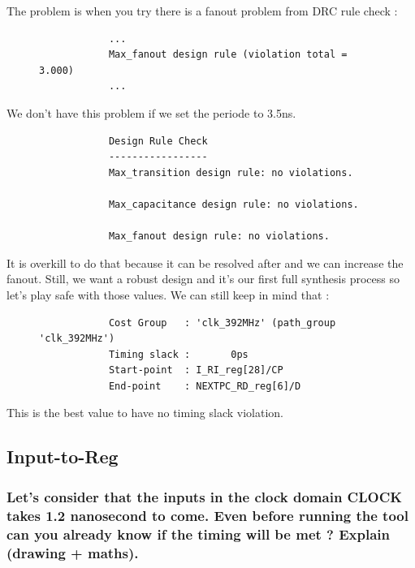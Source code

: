 \documentclass[11pt,a4paper,sans,dvipsnames]{report}
\begin{document}
	The problem is when you try  there is a fanout problem from DRC rule check :

	\begin{figure}[h!]
		\centering
		\begin{lstlisting}
			...
			Max_fanout design rule (violation total = 3.000)
			...
		\end{lstlisting}
	\end{figure}

	We don't have this problem if we set the periode to 3.5ns.


	\begin{figure}[h!]
		\centering
		\begin{lstlisting}
			Design Rule Check
			-----------------
			Max_transition design rule: no violations.

			Max_capacitance design rule: no violations.

			Max_fanout design rule: no violations.
		\end{lstlisting}
	\end{figure}

	It is overkill to do that because it can be resolved after and we can increase the fanout. Still, we want a robust design and it's our first full synthesis process so let's play safe with those values. We can still keep in mind that :
	\begin{figure}[h!]
		\centering
		\begin{lstlisting}
			Cost Group   : 'clk_392MHz' (path_group 'clk_392MHz')
			Timing slack :       0ps 
			Start-point  : I_RI_reg[28]/CP
			End-point    : NEXTPC_RD_reg[6]/D
		\end{lstlisting}
	\end{figure}
	This is the best value to have no timing slack violation.

	\subsection{Input-to-Reg}

	\subsubsection*{Let's consider that the inputs in the clock domain CLOCK takes 1.2 nanosecond to come. Even before running the tool can you already know if the timing will be met ? Explain (drawing + maths).}
\end{document}
